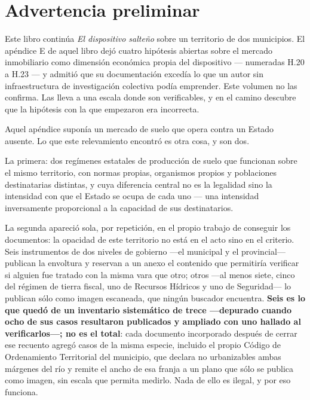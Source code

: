 \chapter*{Advertencia preliminar}

Este libro continúa \textit{El dispositivo salteño} sobre un territorio de dos municipios. El apéndice E de aquel libro dejó cuatro hipótesis abiertas sobre el mercado inmobiliario como dimensión económica propia del dispositivo --- numeradas H.20 a H.23 --- y admitió que su documentación excedía lo que un autor sin infraestructura de investigación colectiva podía emprender. Este volumen no las confirma. Las lleva a una escala donde son verificables, y en el camino descubre que la hipótesis con la que empezaron era incorrecta.

Aquel apéndice suponía un mercado de suelo que opera contra un Estado ausente. Lo que este relevamiento encontró es otra cosa, y son dos.

La primera: dos regímenes estatales de producción de suelo que funcionan sobre el mismo territorio, con normas propias, organismos propios y poblaciones destinatarias distintas, y cuya diferencia central no es la legalidad sino la intensidad con que el Estado se ocupa de cada uno --- una intensidad inversamente proporcional a la capacidad de sus destinatarios.

La segunda apareció sola, por repetición, en el propio trabajo de conseguir los documentos: la opacidad de este territorio no está en el acto sino en el criterio. Seis instrumentos de dos niveles de gobierno ---el municipal y el provincial--- publican la envoltura y reservan a un anexo el contenido que permitiría verificar si alguien fue tratado con la misma vara que otro; otros ---al menos siete, cinco del régimen de tierra fiscal, uno de Recursos Hídricos y uno de Seguridad--- lo publican sólo como imagen escaneada, que ningún buscador encuentra. \textbf{Seis es lo que quedó de un inventario sistemático de trece ---depurado cuando ocho de sus casos resultaron publicados y ampliado con uno hallado al verificarlos---; no es el total}: cada documento incorporado después de cerrar ese recuento agregó casos de la misma especie, incluido el propio Código de Ordenamiento Territorial del municipio, que declara no urbanizables ambas márgenes del río y remite el ancho de esa franja a un plano que sólo se publica como imagen, sin escala que permita medirlo. Nada de ello es ilegal, y por eso funciona.


